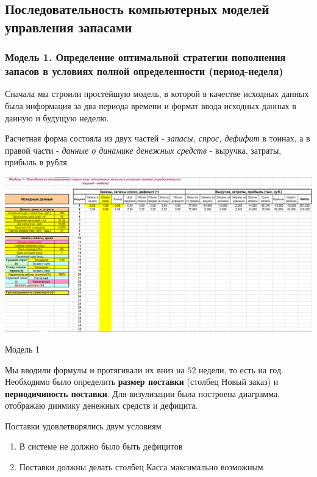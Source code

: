 \documentclass[aps,%
12pt,%
final,%
oneside,
onecolumn,%
musixtex, %
superscriptaddress,%
centertags]{article} %
\theoremstyle{plain}
\theoremstyle{definition}
\theoremstyle{remark}
\begin{document}
\newpage
\subsection{Последовательность компьютерных моделей управления запасами}

\subsubsection{Модель 1. Определение оптимальной стратегии пополнения запасов в условиях полной определенности (период-неделя)}

Сначала мы строили простейшую модель, в которой в качестве исходных данных была информация за два периода времени и формат ввода исходных данных в данную и будущую неделю.

Расчетная форма состояла из двух частей - \textit{запасы, спрос, дефифит} в тоннах, а в правой части - \textit{данные о динамике денежных средств} - выручка, затраты, прибыль в рубля

\begin{center}
  \includegraphics[scale=0.3]{images/4a.png}

  Модель 1
\end{center}

Мы вводили формулы и протягивали их вниз на $52$ недели, то есть на год. Необходимо было определить \textbf{размер поставки} (столбец Новый заказ) и \textbf{периодичиность поставки}. Для визулизации была построена диаграмма, отображаю динмику денежных средств и дефицита.

Поставки удовлетворялись двум условиям
\begin{enumerate}
	\item В системе не должно было быть дефицитов
	\item Поставки должны делать столбец Касса максимально возможным
\end{enumerate}
\end{document}
